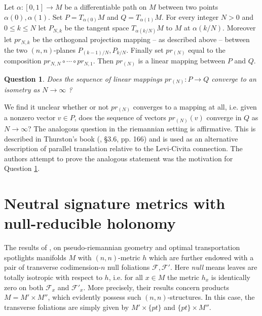 \documentclass[12pt]{amsart}
\newtheorem*{question}{Question}
\theoremstyle{definition}
\theoremstyle{remark}
\newcommand{\sF}{\mathscr{F}}
\begin{document}
Let $\alpha:[0,1]\to M$ be a differentiable path on $M$ between two points $\alpha(0),\alpha(1)$. Set $P=T_{\alpha(0)}M$ and $Q=T_{\alpha(1)}M$. For every integer $N>0$ and $0\leq k \leq N$ let $P_{N,k}$ be the tangent space $T_{\alpha(k/N)}M$ to $M$ at $\alpha(k/N)$. Moreover let $pr_{N,k}$ be the orthogonal projection mapping -- as described above -- between the two $(n,n)$-planes $P_{(k-1)/N}, P_{k/N}$. Finally set $pr_{(N)}$ equal to the composition $pr_{N,N}\circ \cdots \circ pr_{N,1}.$ Then $pr_{(N)}$ is a linear mapping between $P$ and $Q$. 

\begin{question}\label{qq}        
Does the sequence of linear mappings $pr_{(N)}:P \to Q$ converge to an isometry as $N \to \infty$ ? 
\end{question}

We find it unclear whether or not $pr_{(N)}$ converges to a mapping at all, i.e. given a nonzero vector $v\in P$, does the sequence of vectors $pr_{(N)}(v)$ converge in $Q$ as $N \to \infty$? The analogous question in the riemannian setting is affirmative. This is described in Thurston's book (\cite{Th}, \S 3.6, pp. 166) and is used as an alternative description of parallel translation relative to the Levi-Civita connection. The authors attempt to prove the analogous statement was the motivation for Question \ref{qq}.  












\section{Neutral signature metrics with null-reducible holonomy}\label{holonomy}
The results of \cite{KM}, \cite{KMW} on pseudo-riemannian geometry and optimal transportation spotlights manifolds $M$ with $(n,n)$-metric $h$ which are further endowed with a pair of transverse codimension-$n$ null foliations $\sF, \sF'$. Here \emph{null} means leaves are totally isotropic with respect to $h$, i.e. for all $x\in M$ the metric $h_x$ is identically zero on both $\sF_x$ and $\sF'_x$. More precisely, their results concern products $M=M' \times M''$, which evidently possess such $(n,n)$-structures. In this case, the transverse foliations are simply given by $M' \times \{pt\}$ and $\{pt\} \times M''$. 
\end{document}
